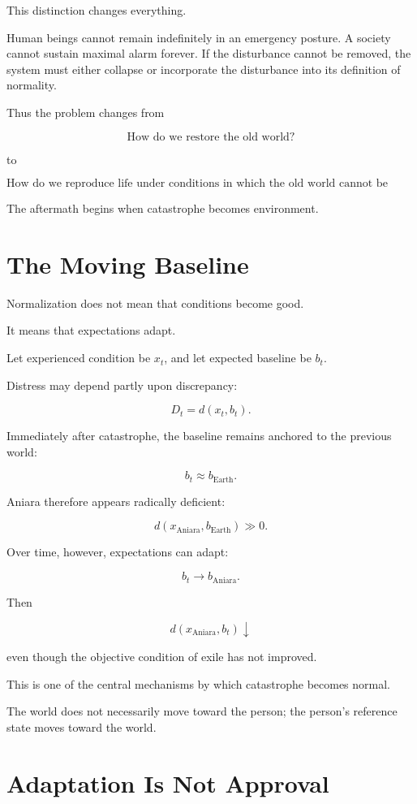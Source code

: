 \documentclass[11pt,oneside]{book}
\theoremstyle{definition}
\theoremstyle{remark}
\begin{document}
This distinction changes everything.

Human beings cannot remain indefinitely in an emergency posture. A society cannot sustain maximal alarm forever. If the disturbance cannot be removed, the system must either collapse or incorporate the disturbance into its definition of normality.

Thus the problem changes from

\[
\text{How do we restore the old world?}
\]

to

\[
\text{How do we reproduce life under conditions in which the old world cannot be restored?}
\]

The aftermath begins when catastrophe becomes environment.

\section{The Moving Baseline}

Normalization does not mean that conditions become good.

It means that expectations adapt.

Let experienced condition be \(x_t\), and let expected baseline be \(b_t\).

Distress may depend partly upon discrepancy:

\[
D_t
=
d(x_t,b_t).
\]

Immediately after catastrophe, the baseline remains anchored to the previous world:

\[
b_t\approx b_{\mathrm{Earth}}.
\]

Aniara therefore appears radically deficient:

\[
d(x_{\mathrm{Aniara}},b_{\mathrm{Earth}})
\gg0.
\]

Over time, however, expectations can adapt:

\[
b_t
\rightarrow
b_{\mathrm{Aniara}}.
\]

Then

\[
d(x_{\mathrm{Aniara}},b_t)
\downarrow
\]

even though the objective condition of exile has not improved.

This is one of the central mechanisms by which catastrophe becomes normal.

The world does not necessarily move toward the person; the person's reference state moves toward the world.

\section{Adaptation Is Not Approval}
\end{document}
